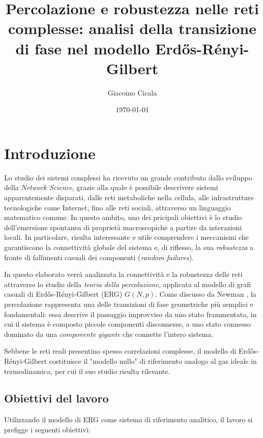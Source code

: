 \documentclass[12pt,italian]{article}
\title{Percolazione e robustezza nelle reti complesse: analisi della transizione di fase nel modello Erdős-Rényi-Gilbert}
\author{Giacomo Cicala}
\date{\today}
\begin{document}
\maketitle
\renewcommand{\abstractname}{Abstract}

\section{Introduzione}
Lo studio dei sistemi complessi ha ricevuto un grande contributo dallo sviluppo della \emph{Network Science}, grazie alla quale è possibile descrivere sistemi apparentemente disparati, dalle reti metaboliche nella cellula, alle infrastrutture tecnologiche come Internet, fino alle reti sociali, attraverso un linguaggio matematico comune.
In questo ambito, uno dei pricipali obiettivi è lo studio dell'emersione spontanea di proprietà macroscopiche a partire da interazioni locali. In particolare, risulta interessante e utile comprendere i meccanismi che garantiscono la connettività globale del sistema e, di riflesso, la sua \emph{robustezza} a fronte di fallimenti casuali dei componenti (\emph{random failures}).

In questo elaborato verrà analizzata la connettività e la robustezza delle reti attraverso lo studio della \emph{teoria della percolazione}, applicata al modello di grafi casuali di Erdős-Rényi-Gilbert (ERG) $G(N, p)$.
Come discusso da Newman \cite{newman2018networks}, la percolazione rappresenta una delle transizioni di fase geometriche più semplici e fondamentali: essa descrive il passaggio improvviso da uno stato frammentato, in cui il sistema è composto piccole componenti disconnesse, a uno stato connesso dominato da una \emph{componente gigante} che connette l'intero sistema.

Sebbene le reti reali presentino spesso correlazioni complesse, il modello di Erdős-Rényi-Gilbert costituisce il "modello nullo" di riferimento analogo al gas ideale in termodinamica, per cui il suo studio risulta rilevante.

\subsection{Obiettivi del lavoro}
Utilizzando il modello di ERG come sistema di riferimento analitico, il lavoro si prefigge i seguenti obiettivi:
\end{document}
